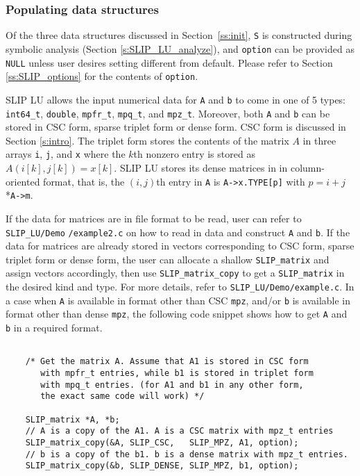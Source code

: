 \documentclass[12pt]{article}
\theoremstyle{definition}
\begin{document}
\subsubsection{Populating data structures}
\label{ss:populate_Ab}

Of the three data structures discussed in Section~\ref{ss:init}, \verb|S| is
constructed during symbolic analysis (Section \ref{s:SLIP_LU_analyze}), and
\verb|option| can be provided as \verb|NULL| unless user desires setting different
from default.  Please refer to Section \ref{ss:SLIP_options} for the contents
of \verb|option|.

SLIP LU allows the input numerical data for \verb|A| and \verb|b| to come in
one of 5 types: \verb|int64_t|, \verb|double|, \verb|mpfr_t|, \verb|mpq_t|,
and \verb|mpz_t|. Moreover, both \verb|A| and \verb|b| can be stored in
CSC form, sparse triplet form or dense form. CSC form is discussed in Section
\ref{s:intro}. The triplet form stores the contents of the matrix $A$
in three arrays \verb|i|, \verb|j|, and \verb|x| where the $k$th nonzero entry
is stored as $A ( i[k], j[k]) = x[k]$. SLIP LU stores its dense matrices in
in column-oriented format, that is, the $(i,j)$th entry in \verb|A|
is \verb|A->x.TYPE[p]| with $p = i+j$*\verb|A->m|.

If the data for matrices are in file format to be read, user can refer to
\verb|SLIP_LU/Demo| \verb|/example2.c| on how to read in data and construct
\verb|A| and \verb|b|. If the data for matrices are already stored in vectors
corresponding to CSC form, sparse triplet form or dense form, the user can
allocate a shallow \verb|SLIP_matrix| and assign vectors accordingly, then use
\verb|SLIP_matrix_copy| to get a \verb|SLIP_matrix| in the desired kind and
type. For more details, refer to \verb|SLIP_LU/Demo/example.c|. In a case when
\verb|A| is available in format other than CSC \verb|mpz|, and/or \verb|b|
is available in format other than dense \verb|mpz|, the following code
snippet shows how to get \verb|A| and \verb|b| in a required format.

{\small
\begin{verbatim}

    /* Get the matrix A. Assume that A1 is stored in CSC form
       with mpfr_t entries, while b1 is stored in triplet form
       with mpq_t entries. (for A1 and b1 in any other form,
       the exact same code will work) */

    SLIP_matrix *A, *b;
    // A is a copy of the A1. A is a CSC matrix with mpz_t entries
    SLIP_matrix_copy(&A, SLIP_CSC,   SLIP_MPZ, A1, option);
    // b is a copy of the b1. b is a dense matrix with mpz_t entries. 
    SLIP_matrix_copy(&b, SLIP_DENSE, SLIP_MPZ, b1, option);
    \end{verbatim} }
\end{document}
